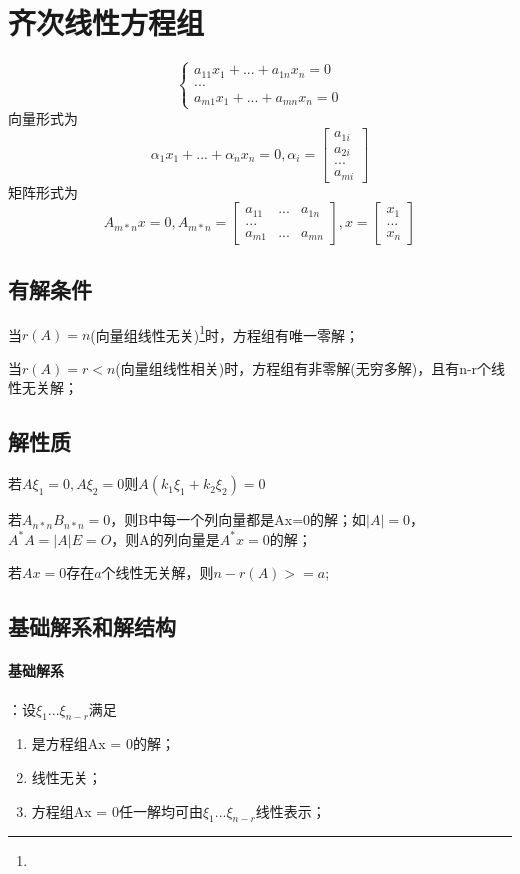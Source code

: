 \section{齐次线性方程组}
\[
\begin{cases}
a_{11}x_1 + ... + a_{1n}x_n = 0 \\ 
... \\ 
a_{m1}x_1 + ... + a_{mn}x_n = 0
\end{cases}
\]
向量形式为
\[\alpha_1x_1 + ... + \alpha_nx_n = 0, \alpha_i = 
\begin{bmatrix}
a_{1i} \\ 
a_{2i} \\
... \\ 
a_{mi}
\end{bmatrix}
\]
矩阵形式为
\[A_{m*n}x = 0, A_{m*n} = 
\begin{bmatrix}
a_{11} & ... & a_{1n} \\ 
... \\ 
a_{m1} & ... & a_{mn}
\end{bmatrix}, x = 
\begin{bmatrix}
x_1 \\ 
... \\ 
x_n
\end{bmatrix}
\]

\subsection{有解条件}
当\(r(A) = n\)(向量组线性无关)\footnote{\mymatrix}时，方程组有唯一零解；

当\(r(A) = r < n\)(向量组线性相关)时，方程组有非零解(无穷多解)，且有n-r个线性无关解；

\subsection{解性质}
若\(A\xi_1 = 0, A\xi_2 = 0\)则\(A(k_1\xi_1 + k_2\xi_2) = 0\)

若\(A_{n*n}B_{n*n} = 0\)，则B中每一个列向量都是Ax=0的解；如\(|A| = 0\)，\(A^*A = |A|E = O\)，则A的列向量是\(A^*x = 0\)的解；

若\(Ax = 0\)存在\(a\)个线性无关解，则\(n - r(A) >= a\);

\subsection{基础解系和解结构}
\paragraph{基础解系}
：设\(\xi_1...\xi_{n - r}\)满足\begin{enumerate}
    \item 是方程组Ax = 0的解；
    \item 线性无关；
    \item 方程组Ax = 0任一解均可由\(\xi_1...\xi_{n - r}\)线性表示；
\end{enumerate}


